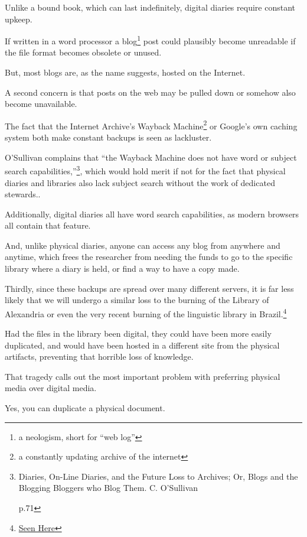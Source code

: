 \documentclass[12pt]{article}[titlepage]
\newcommand{\say}[1]{``#1''}
\newcommand{\1}{\={a}}
\newcommand{\2}{\={e}}
\newcommand{\3}{\={\i}}
\newcommand{\4}{\=o}
\newcommand{\5}{\=u}
\newcommand{\6}{\={A}}
\renewcommand{\,}{\textsuperscript{,}}
\begin{document}
Unlike a bound book, which can last indefinitely, digital diaries require constant upkeep.

If written in a word processor a blog\footnote{a neologism, short for \say{web log}} post could plausibly become unreadable if the file format becomes obsolete or unused.

But, most blogs are, as the name suggests, hosted on the Internet.


A second concern is that posts on the web may be pulled down or somehow also become unavailable.

The fact that the Internet Archive’s Wayback Machine\footnote{a constantly updating archive of the internet} or Google’s own caching system both make constant backups is seen as lackluster.

O’Sullivan complains that \say{the Wayback Machine does not have word or subject search capabilities,}\footnote{Diaries, On-Line Diaries, and the Future Loss to Archives; Or, Blogs and the Blogging Bloggers who Blog Them. C. O’Sullivan

p.71}, which would hold merit if not for the fact that physical diaries and libraries also lack subject search without the work of dedicated stewards..

Additionally, digital diaries all have word search capabilities, as modern browsers all contain that feature.

And, unlike physical diaries, anyone can access any blog from anywhere and anytime, which frees the researcher from needing the funds to go to the specific library where a diary is held, or find a way to have a copy made.


Thirdly, since these backups are spread over many different servers, it is far less likely that we will undergo a similar loss to the burning of the Library of Alexandria or even the very recent burning of the linguistic library in Brazil.\footnote{\href{https://www.nationalgeographic.com/science/2018/09/news-museu-nacional-fire-rio-de-janeiro-natural-history/}{Seen Here}}

Had the files in the library been digital, they could have been more easily duplicated, and would have been hosted in a different site from the physical artifacts, preventing that horrible loss of knowledge.


That tragedy calls out the most important problem with preferring physical media over digital media.

Yes, you can duplicate a physical document.
\end{document}
